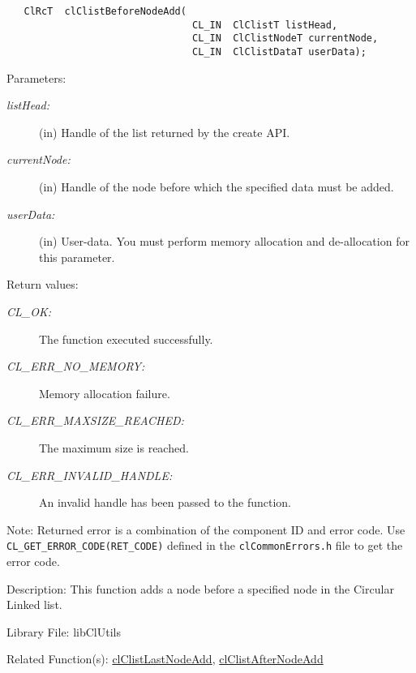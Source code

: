 \begin{flushleft}
\begin{Desc}
\footnotesize\begin{verbatim}   ClRcT  clClistBeforeNodeAdd(
                         		CL_IN  ClClistT listHead,
                         		CL_IN  ClClistNodeT currentNode,
                         		CL_IN  ClClistDataT userData);
\end{verbatim}
\normalsize
\end{Desc}
\begin{Desc}
\item[Parameters:]
\begin{description}
\item[{\em list\-Head:}](in) Handle of the list returned by the create API. \item[{\em current\-Node:}](in) Handle of the node before which the specified
data must be added. 
\item[{\em user\-Data:}](in) User-data. You must perform memory allocation and de-allocation for this parameter.\end{description}
\end{Desc}
\begin{Desc}
\item[Return values:]
\begin{description}
\item[{\em CL\_\-OK:}]The function executed successfully. \item[{\em CL\_\-ERR\_\-NO\_\-MEMORY:}]Memory allocation failure. 
\item[{\em CL\_\-ERR\_\-MAXSIZE\_\-REACHED:}]The maximum size is reached. 
\item[{\em CL\_\-ERR\_\-INVALID\_\-HANDLE:}]An invalid handle has been passed to the function.\end{description}
\end{Desc}
\begin{Desc}
\item[Note:]Returned error is a combination of the component ID and error code. Use {\tt{CL\_\-GET\_\-ERROR\_\-CODE(RET\_\-CODE)}} defined in
the {\tt{clCommonErrors.h}} file to get the error code.\end{Desc}
\begin{Desc}
\item[Description:]This function adds a node before a specified node in the Circular Linked list.\end{Desc}
\begin{Desc}
\item[Library File:]lib\-Cl\-Utils\end{Desc}
\begin{Desc}
\item[Related Function(s):]\hyperlink{pagecl103}{cl\-Clist\-Last\-Node\-Add}, \hyperlink{pagecl104}{cl\-Clist\-After\-Node\-Add} \end{Desc}
\newpage



\end{flushleft}
